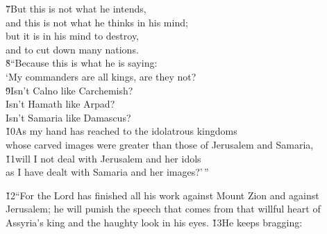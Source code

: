 \begin{poetry}
\poeml \v{7}But this is not what he intends, \\
\poemll    and this is not what he thinks in his mind; \\
\poeml but it is in his mind to destroy, \\
\poemll    and to cut down many nations. \\
\poeml \v{8}``Because this is what he is saying: \\
\poemll    `My commanders are all kings, are they not? \\
\poeml \v{9}Isn't Calno like Carchemish? \\
\poemll    Isn't Hamath like Arpad? \\
\poemlll       Isn't Samaria like Damascus? \\
\poeml \v{10}As my hand has reached to the idolatrous kingdoms \\
\poemll    whose carved images were greater than those of Jerusalem and Samaria, \\
\poeml \v{11}will I not deal with Jerusalem and her idols \\
\poemll    as I have dealt with Samaria and her images?'\,''
\end{poetry}

\v{12}``For the Lord has finished all his work against Mount Zion and against Jerusalem; he will punish the speech that comes from that willful heart of Assyria's king and the haughty look in his eyes. \v{13}He keeps bragging:

